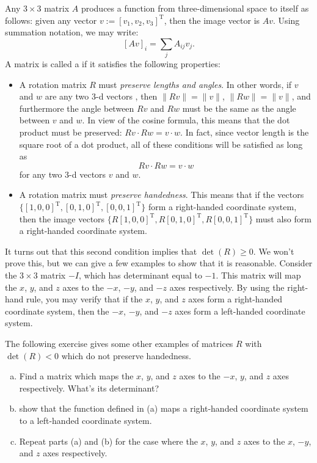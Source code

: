 Any $3 \times 3$ matrix $A$  produces a function from three-dimensional space to itself as follows: given any vector $v:=[v_1,v_2,v_3]^{\text{T}}$, then the image vector is $Av$. Using summation notation, we may write:
\[ [Av]_i = \sum_j A_{ij} v_j.\]
A matrix is called a  if it satisfies the following properties:
\begin{itemize}
\item
A rotation matrix $R$ must  \emph{preserve  lengths and angles}. In other words, if $v$ and $w$ are any two 3-d vectors , then  $\lVert Rv \rVert = \lVert v \rVert$,  $\lVert Rw \rVert = \lVert v \rVert$, and furthermore the angle between $Rv$ and $Rw$ must be the same as the angle between $v$ and $w$.  In view of the cosine formula, this means that the dot product must be preserved:  $Rv \cdot Rw = v \cdot w$. In fact, since vector length is the square root of a dot product, all of these conditions will be satisfied as long as 
\[ Rv \cdot Rw = v \cdot w \] 
for any two 3-d vectors $v$ and $w$.
\item
A rotation matrix must \emph{preserve handedness}. This means that if the vectors $\{ [1,0,0]^{\text{T}}, [0,1,0]^{\text{T}}, [0,0,1]^{\text{T}} \}$ form a right-handed coordinate system, then the image vectors 
$\{ R[1,0,0]^{\text{T}}, R[0,1,0]^{\text{T}}, R[0,0,1]^{\text{T}} \}$ must also form a right-handed coordinate system.  
\end{itemize}

It turns out that this second condition implies that $\det(R)\ge 0$. We won't prove this, but we can give a few examples to show that it is reasonable. Consider  the $3 \times 3$ matrix $-I$, which has determinant equal to $-1$. This matrix will map the $x$, $y$, and $z$ axes to the $-x$, $-y$, and $-z$ axes respectively. By using the right-hand rule, you may verify that if the $x$, $y$, and $z$ axes form a right-handed coordinate system, then the $-x$, $-y$, and $-z$ axes form a left-handed coordinate system.

The following exercise gives some other examples of matrices $R$ with $\det(R)< 0$ which do not preserve handedness.

\begin{exercise}{}
\begin{enumerate}[(a)]
\item
Find a matrix which  maps the $x$, $y$, and $z$ axes to the $-x$, $y$, and $z$ axes respectively.  What's its determinant?
\item  show that the function defined in (a) maps a right-handed coordinate system to a left-handed coordinate system.
\item Repeat parts (a) and (b) for the case where the $x$, $y$, and $z$ axes to the $x$, $-y$, and $z$ axes respectively.
\end{enumerate}
\end{exercise}

